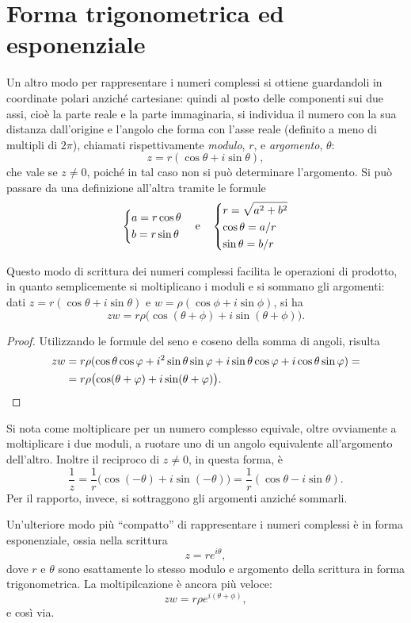 \section{Forma trigonometrica ed esponenziale}
Un altro modo per rappresentare i numeri complessi si ottiene guardandoli in coordinate polari anziché cartesiane: quindi al posto delle componenti sui due assi, cioè la parte reale e la parte immaginaria, si individua il numero con la sua distanza dall'origine e l'angolo che forma con l'asse reale (definito a meno di multipli di $2\pi$), chiamati rispettivamente \emph{modulo}, $r$, e \emph{argomento}, $\theta$:
\[
z=r(\cos\theta+i\sin\theta),
\]
che vale se $z\neq 0$, poiché in tal caso non si può determinare l'argomento.
Si può passare da una definizione all'altra tramite le formule
\[
\begin{dcases}
	a=r\cos\theta\\
	b=r\sin\theta
\end{dcases}
\quad\text{e}\quad
\begin{dcases}
	r=\sqrt{a^2+b^2}\\
	\cos\theta=a/r\\
	\sin\theta=b/r
\end{dcases}
\]


Questo modo di scrittura dei numeri complessi facilita le operazioni di prodotto, in quanto semplicemente si moltiplicano i moduli e si sommano gli argomenti: dati $z=r(\cos\theta+i\sin\theta)$ e $w=\rho(\cos\phi+i\sin\phi)$, si ha
\[
zw=r\rho\big(\!\cos(\theta+\phi)+i\sin(\theta+\phi)\big).
\]
\begin{proof}
Utilizzando le formule del seno e coseno della somma di angoli, risulta
\[
\begin{split}
zw&=r\rho(\cos\theta\cos\phi+i^2\sin\theta\sin\phi+i\sin\theta\cos\phi+i\cos\theta\sin\phi)=\\
&=r\rho\big(\!\cos(\theta+\phi)+i\sin(\theta+\phi)\big)\qedhere.
\end{split}
\]
\end{proof}
Si nota come moltiplicare per un numero complesso equivale, oltre ovviamente a moltiplicare i due moduli, a ruotare uno di un angolo equivalente all'argomento dell'altro.
Inoltre il reciproco di $z\neq 0$, in questa forma, è
\[
\frac1{z}=\frac1{r}\big(\!\cos(-\theta)+i\sin(-\theta)\big)=\frac1{r}(\cos\theta-i\sin\theta).
\]
Per il rapporto, invece, si sottraggono gli argomenti anziché sommarli.

Un'ulteriore modo più ``compatto'' di rappresentare i numeri complessi è in forma esponenziale, ossia nella scrittura
\[
z=re^{i\theta},
\]
dove $r$ e $\theta$ sono esattamente lo stesso modulo e argomento della scrittura in forma trigonometrica. La moltipilcazione è ancora più veloce:
\[
zw=r\rho e^{i(\theta+\phi)},
\]
e così via.

